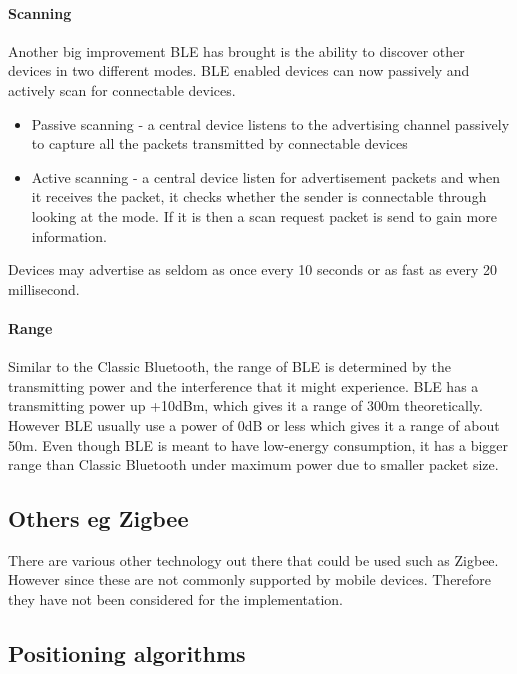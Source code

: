 \paragraph*{Scanning\protect \linebreak{}
}

Another big improvement BLE has brought is the ability to discover
other devices in two different modes. BLE enabled devices can now
passively and actively scan for connectable devices.
\begin{itemize}
\item Passive scanning - a central device listens to the advertising channel
passively to capture all the packets transmitted by connectable devices 
\item Active scanning - a central device listen for advertisement packets
and when it receives the packet, it checks whether the sender is connectable
through looking at the mode. If it is then a scan request packet is
send to gain more information.
\end{itemize}
Devices may advertise as seldom as once every 10 seconds or as fast
as every 20 millisecond. 


\paragraph*{Range\protect \\
}

Similar to the Classic Bluetooth, the range of BLE is determined by
the transmitting power and the interference that it might experience.
BLE has a transmitting power up +10dBm, which gives it a range of
300m theoretically. However BLE usually use a power of 0dB or less
which gives it a range of about 50m. Even though BLE is meant to have
low-energy consumption, it has a bigger range than Classic Bluetooth
under maximum power due to smaller packet size. 


\subsection{Others eg Zigbee}

There are various other technology out there that could be used such
as Zigbee. However since these are not commonly supported by mobile
devices. Therefore they have not been considered for the implementation.

\subsection{Positioning algorithms}


